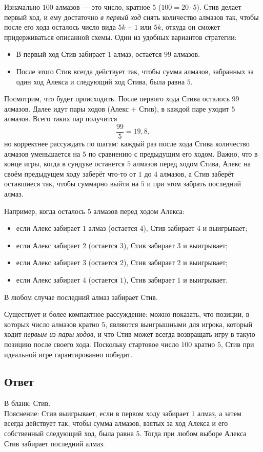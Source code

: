 \documentclass[12pt,a4paper]{article}
\begin{document}
Изначально $100$ алмазов --- это число, кратное $5$ ($100 = 20 \cdot 5$). Стив делает первый ход, и ему достаточно \emph{в первый ход} снять количество алмазов так, чтобы после его хода осталось число вида $5k + 1$ или $5k$, откуда он сможет придерживаться описанной схемы. Один из удобных вариантов стратегии:

\begin{itemize}
  \item В первый ход Стив забирает $1$ алмаз, остаётся $99$ алмазов.
  \item После этого Стив всегда действует так, чтобы сумма алмазов, забранных за один ход Алекса и следующий ход Стива, была равна $5$.
\end{itemize}

Посмотрим, что будет происходить. После первого хода Стива осталось $99$ алмазов. Далее идут пары ходов (Алекс + Стив), в каждой паре уходит $5$ алмазов. Всего таких пар получится
\[
\frac{99}{5} = 19{,}8,
\]
но корректнее рассуждать по шагам: каждый раз после хода Стива количество алмазов уменьшается на $5$ по сравнению с предыдущим его ходом. Важно, что в конце игры, когда в сундуке останется $5$ алмазов перед ходом Стива, Алекс на своём предыдущем ходу заберёт что-то от $1$ до $4$ алмазов, а Стив заберёт оставшиеся так, чтобы суммарно выйти на $5$ и при этом забрать последний алмаз.

Например, когда осталось $5$ алмазов перед ходом Алекса:
\begin{itemize}
  \item если Алекс забирает $1$ алмаз (остается $4$), Стив забирает $4$ и выигрывает;
  \item если Алекс забирает $2$ (остается $3$), Стив забирает $3$ и выигрывает;
  \item если Алекс забирает $3$ (остается $2$), Стив забирает $2$ и выигрывает;
  \item если Алекс забирает $4$ (остается $1$), Стив забирает $1$ и выигрывает.
\end{itemize}

В любом случае последний алмаз забирает Стив.

Существует и более компактное рассуждение: можно показать, что позиции, в которых число алмазов кратно $5$, являются выигрышными для игрока, который ходит \emph{первым из пары ходов}, и что Стив может всегда возвращать игру в такую позицию после своего хода. Поскольку стартовое число $100$ кратно $5$, Стив при идеальной игре гарантированно победит.

\subsection*{Ответ}
В бланк: Стив.\\
Пояснение: Стив выигрывает, если в первом ходу забирает $1$ алмаз, а затем всегда действует так, чтобы сумма алмазов, взятых за ход Алекса и его собственный следующий ход, была равна $5$. Тогда при любом выборе Алекса Стив забирает последний алмаз.
\end{document}
